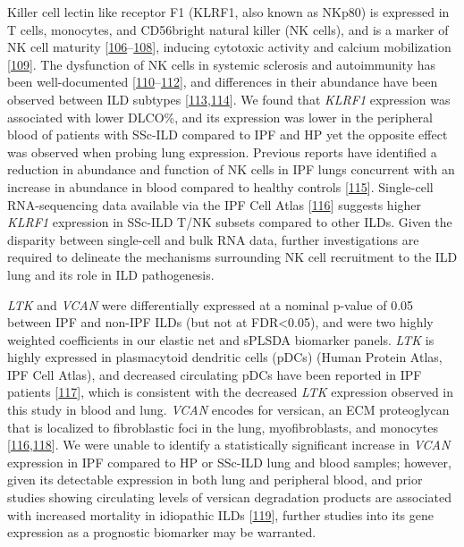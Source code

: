 \documentclass[
]{article}
\begin{document}
Killer cell lectin like receptor F1 (KLRF1, also known as NKp80) is expressed in T cells, monocytes, and CD56bright natural killer (NK cells), and is a marker of NK cell maturity {[}\protect\hyperlink{ref-roda-navarro_human_2000}{106}--\protect\hyperlink{ref-mukherjee_klrf1_2023}{108}{]}, inducing cytotoxic activity and calcium mobilization {[}\protect\hyperlink{ref-vitale_identification_2001}{109}{]}. The dysfunction of NK cells in systemic sclerosis and autoimmunity has been well-documented {[}\protect\hyperlink{ref-horikawa_abnormal_2005}{110}--\protect\hyperlink{ref-liu_nk_2021}{112}{]}, and differences in their abundance have been observed between ILD subtypes {[}\protect\hyperlink{ref-esposito_natural_2005}{113},\protect\hyperlink{ref-bergantini_prognostic_2021}{114}{]}. We found that \textit{KLRF1} expression was associated with lower DLCO\%, and its expression was lower in the peripheral blood of patients with SSc-ILD compared to IPF and HP yet the opposite effect was observed when probing lung expression. Previous reports have identified a reduction in abundance and function of NK cells in IPF lungs concurrent with an increase in abundance in blood compared to healthy controls {[}\protect\hyperlink{ref-cruz_reduced_2021}{115}{]}. Single-cell RNA-sequencing data available via the IPF Cell Atlas {[}\protect\hyperlink{ref-neumark_idiopathic_2020}{116}{]} suggests higher \textit{KLRF1} expression in SSc-ILD T/NK subsets compared to other ILDs. Given the disparity between single-cell and bulk RNA data, further investigations are required to delineate the mechanisms surrounding NK cell recruitment to the ILD lung and its role in ILD pathogenesis.

\textit{LTK} and \textit{VCAN} were differentially expressed at a nominal p-value of 0.05 between IPF and non-IPF ILDs (but not at FDR\textless0.05), and were two highly weighted coefficients in our elastic net and sPLSDA biomarker panels. \textit{LTK} is highly expressed in plasmacytoid dendritic cells (pDCs) (Human Protein Atlas, IPF Cell Atlas), and decreased circulating pDCs have been reported in IPF patients {[}\protect\hyperlink{ref-galati_circulating_2020}{117}{]}, which is consistent with the decreased \textit{LTK} expression observed in this study in blood and lung. \textit{VCAN} encodes for versican, an ECM proteoglycan that is localized to fibroblastic foci in the lung, myofibroblasts, and monocytes {[}\protect\hyperlink{ref-neumark_idiopathic_2020}{116},\protect\hyperlink{ref-bensadoun_proteoglycan_1996}{118}{]}. We were unable to identify a statistically significant increase in \textit{VCAN} expression in IPF compared to HP or SSc-ILD lung and blood samples; however, given its detectable expression in both lung and peripheral blood, and prior studies showing circulating levels of versican degradation products are associated with increased mortality in idiopathic ILDs {[}\protect\hyperlink{ref-sand_serological_2018}{119}{]}, further studies into its gene expression as a prognostic biomarker may be warranted.
\end{document}
